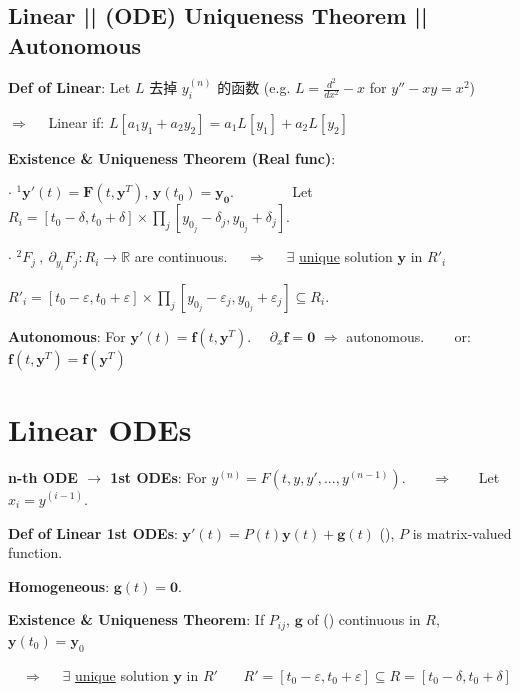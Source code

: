 \documentclass[8pt]{extarticle}
\begin{document}
\begin{minipage}[t]{0.39\textwidth}


\subsection{Linear || (ODE) Uniqueness Theorem || Autonomous}

\textbf{Def of Linear}: Let $L$ { 去掉 $y^{(n)}_i$ 的函数} {\scriptsize (e.g. $L=\frac{d^2}{dx^2}-x$ for $y''-xy=x^2$)} 

\hspace{28pt} $\Rightarrow$ \ \ Linear if: $L[a_1y_1+a_2y_2]=a_1L[y_1]+a_2L[y_2]$

\textbf{Existence \& Uniqueness Theorem (Real func)}:

$\cdot$ $^1\mathbf{y}'(t)=\mathbf{F}(t,\mathbf{y}^T)$, $\mathbf{y}(t_0)=\mathbf{y_0}$. \ \ \ \ \ \ \ { Let $R_i=[t_0-\delta,t_0+\delta]\times\prod_j[y_{0_j}-\delta_j,y_{0_j}+\delta_j]$.}

$\cdot$ $^2F_j  \ , \ \partial_{y_i}F_j:R_i \to \mathbb{R}$ are continuous.  \ \ $\Rightarrow$ \ \ $\exists$ \underline{unique} solution $\mathbf{y}$ in $R'_i$

\hspace{85pt} $R'_i=[t_0-\varepsilon,t_0+\varepsilon]\times\prod_j[y_{0_j}-\varepsilon_j,y_{0_j}+\varepsilon_j]\subseteq R_i$.

\textbf{Autonomous}: For $\mathbf{y}'(t)=\mathbf{f}(t,\mathbf{y}^T)$. \ \ $\partial_x\mathbf{f}=\mathbf{0}$ $\Rightarrow$ autonomous. \ \ \ { or: $\mathbf{f}(t,\mathbf{y}^T)=\mathbf{f}(\mathbf{y}^T)$}


\section{Linear ODEs}

\textbf{n-th ODE $\rightarrow$ 1st ODEs}: For  $y^{(n)}=F(t,y,y',...,y^{(n-1)})$. \ \ \ $\Rightarrow$ \ \ \ Let $x_i=y^{(i-1)}$.

\textbf{Def of Linear 1st ODEs}: $\mathbf{y}'(t) = P(t)\mathbf{y}(t) + \mathbf{g}(t)$ (\star), {\tiny $P$ is matrix-valued function.}

\hspace{137pt} \textbf{Homogeneous}: $\mathbf{g}(t)=\mathbf{0}$.

\textbf{Existence \& Uniqueness Theorem}: If $P_{ij}$, $\mathbf{g}$ of (\star) continuous in $R$, $\mathbf{y}(t_0)=\mathbf{y}_0$

\ \ $\Rightarrow$ \ \ $\exists$ \underline{unique} solution $\mathbf{y}$ in $R'$ \ \ \ {\tiny $R'=[t_0-\varepsilon,t_0+\varepsilon]\subseteq R=[t_0-\delta,t_0+\delta]$}

\end{minipage}
\end{document}
